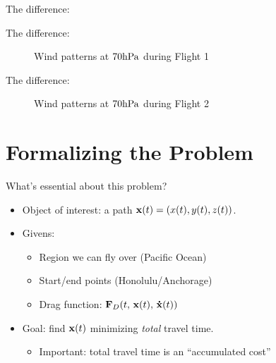 \documentclass{fkpresentation}
\begin{document}
\begin{frame}{The difference:}
  \vfill
\end{frame}

\begin{frame}{The difference:}
  \vfill
  \begin{figure}[h]
    \centering
    \caption{Wind patterns at $70\mathrm{hPa}$ during Flight 1}
  \end{figure}
  \vfill
\end{frame}

\begin{frame}{The difference:}
  \vfill
  \begin{figure}[h]
    \centering
    \caption{Wind patterns at $70\mathrm{hPa}$ during Flight 2}
  \end{figure}
  \vfill
\end{frame}

\section{Formalizing the Problem}

\begin{frame}{What's essential about this problem?}
  \begin{itemize}
    \item Object of interest: a path $\mathbf{x}(t) = (x(t), y(t), z(t))$.
    \item Givens:
      \begin{itemize}
        \item Region we can fly over (Pacific Ocean)
        \item Start/end points (Honolulu/Anchorage)
        \item Drag function: $\mathbf{F}_D(t,\, \mathbf{x}(t),\, \mathbf{\dot{x}}(t))$
      \end{itemize}
    \item Goal: find $\mathbf{x}(t)$ minimizing \emph{total} travel time.\pause
      \begin{itemize}
        \item Important: total travel time is an ``accumulated cost''
      \end{itemize}
  \end{itemize}
\end{frame}
\end{document}
